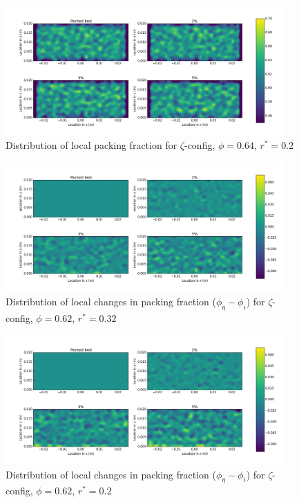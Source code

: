 \begin{figure}[!t]
    \centering
    \includegraphics[width = 0.95\textwidth]{figures/z-62-r125-1.png}
    \caption{Distribution of local packing fraction for $\zeta$-config, $\phi = 0.64$, $r^* = 0.2$}\label{fig:z-624r125}
\end{figure}



\begin{figure}[!t]
    \centering
    \includegraphics[width = 0.95\textwidth]{figures/z-62-r23-1-deltas.png}
    \caption{Distribution of local changes in packing fraction ($\phi_{\eta} - \phi_i$) for $\zeta$-config, $\phi = 0.62$, $r^* = 0.32$}\label{fig:z-62-r23-deltas}
\end{figure}

\begin{figure}[!t]
    \centering
    \includegraphics[width = 0.95\textwidth]{figures/z-62-r125-1-deltas.png}
    \caption{Distribution of local changes in packing fraction ($\phi_{\eta} - \phi_i$) for $\zeta$-config, $\phi = 0.62$, $r^* = 0.2$}\label{fig:z-62-r125-deltas}
\end{figure}

